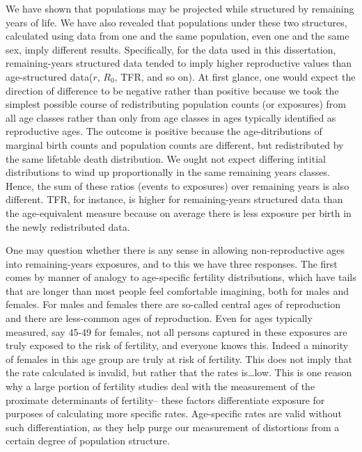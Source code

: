 We have shown that populations may be projected while structured by
remaining years of life. We have also revealed that populations under these two
structures, calculated using data from one and the same population, even one and the same
sex, imply different results. Specifically, for the data used in this
dissertation, remaining-years structured data tended to imply higher
reproductive values than age-structured data($r$, $R_0$, TFR, and so
on). At first glance, one would expect the direction of difference to be
negative rather than positive because we took the simplest possible course of
redistributing population counts (or exposures) from all age classes rather than
only from age classes in ages typically identified as reproductive ages. The
outcome is positive because the age-ditributions of marginal birth counts and
population counts are different, but redistributed by the same lifetable death
distribution. We ought not expect differing intitial distributions to wind up
proportionally in the same remaining years classes. Hence, the sum of these
ratios (events to exposures) over remaining years is also different. TFR, for
instance, is higher for remaining-years structured data than the age-equivalent
measure because on average there is less exposure per birth in the newly
redistributed data.

One may question whether there is any sense in allowing non-reproductive ages
into remaining-years exposures, and to this we have three responses. The first
comes by manner of analogy to age-specific fertility distributions, which
have tails that are longer than most people feel comfortable imagining, 
both for males and females. For males and
females there are so-called central ages of reproduction and there are
less-common ages of reproduction. Even for ages typically measured, say
45-49 for females, not all persons captured in these exposures are truly
exposed to the risk of fertility, and everyone knows this. Indeed a minority
of females in this age group are truly at risk of fertility. This does not imply
that the rate calculated is invalid, but rather that the rates is\ldots low.
This is one reason why a large portion of fertility studies deal with the
measurement of the proximate determinants of fertility-- these
factors differentiate exposure for purposes of calculating more specific rates.
Age-specific rates are valid without such differentiation, as they help purge
our measurement of distortions from a certain degree of population structure. 

